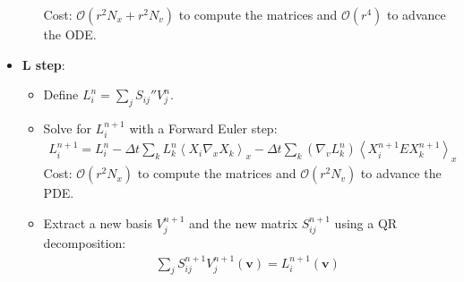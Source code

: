 \documentclass{article}
\begin{document}
\begin{itemize}
\begin{itemize}
            Cost: \(\mathcal{O}(r^2 N_x + r^2 N_v)\) to compute the matrices and \(\mathcal{O}(r^4)\) to advance the ODE.
    \end{itemize}
\item \textbf{L step}:
    \begin{itemize}
        \item Define \(L^n_i = \sum_{j}^{} S_{ij}'' V_j^n\).
        \item Solve for \(L_i^{n+1}\) with a Forward Euler step:
            \begin{align}
                L_i^{n+1} = L_i^n - \Delta t \sum_{k}^{} L_k^n \left\langle X_i \nabla_x X_k \right\rangle_x - \Delta t \sum_{k}^{} (\nabla_v L_k^n) \left\langle X_i^{n+1} E X_k^{n+1} \right\rangle_x
            \end{align}
        Cost: \(\mathcal{O}(r^2 N_x)\) to compute the matrices and \(\mathcal{O}(r^2 N_v)\) to advance the PDE.
    \item Extract a new basis \(V_j^{n+1}\) and the new matrix \(S_{ij}^{n+1}\) using a QR decomposition:
        \begin{align}
            \sum_{j}^{} S_{ij}^{n+1} V_j^{n+1}(\bm{v}) = L_i^{n+1}(\bm{v})
        \end{align}
    \end{itemize}
\end{itemize}
\end{document}

